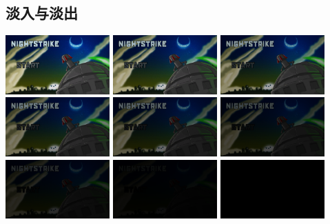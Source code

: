 \documentclass[10pt]{book}
\begin{document}
\begin{CJK}{UTF8}{gkai}
\newpage
\section{淡入与淡出}

\begin{center}
\includegraphics[width=0.3\textwidth]{fade/0.png}
\includegraphics[width=0.3\textwidth]{fade/1.png}
\includegraphics[width=0.3\textwidth]{fade/2.png}
\includegraphics[width=0.3\textwidth]{fade/3.png}
\includegraphics[width=0.3\textwidth]{fade/4.png}
\includegraphics[width=0.3\textwidth]{fade/5.png}
\includegraphics[width=0.3\textwidth]{fade/6.png}
\includegraphics[width=0.3\textwidth]{fade/7.png}
\includegraphics[width=0.3\textwidth]{fade/8.png}
\end{center}


\end{CJK}
\end{document}
